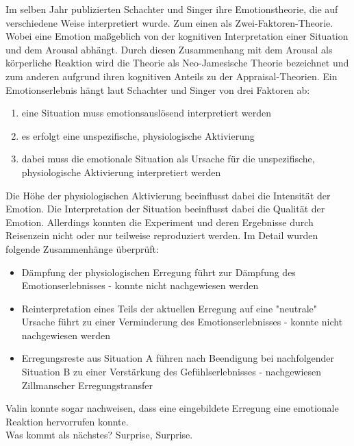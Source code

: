 Im selben Jahr publizierten Schachter und Singer ihre Emotionstheorie, die auf verschiedene Weise interpretiert wurde. Zum einen als Zwei-Faktoren-Theorie. Wobei eine Emotion maßgeblich von der kognitiven Interpretation einer Situation und dem Arousal abhängt. Durch diesen Zusammenhang mit dem Arousal als körperliche Reaktion wird die Theorie als Neo-Jamesische Theorie bezeichnet und zum anderen aufgrund ihren kognitiven Anteils zu der Appraisal-Theorien. Ein Emotionserlebnis hängt laut Schachter und Singer von drei Faktoren ab:

\begin{enumerate}
\item eine Situation muss emotionsauslösend interpretiert werden
\item es erfolgt eine unspezifische, physiologische Aktivierung
\item dabei muss die emotionale Situation als Ursache für die unspezifische, physiologische Aktivierung interpretiert werden
\end{enumerate}

Die Höhe der physiologischen Aktivierung beeinflusst dabei die Intensität der Emotion. Die Interpretation der Situation beeinflusst dabei die Qualität der Emotion. Allerdings konnten die Experiment und deren Ergebnisse durch Reisenzein nicht oder nur teilweise reproduziert werden. Im Detail wurden folgende Zusammenhänge überprüft:
\begin{itemize}
\item Dämpfung der physiologischen Erregung führt zur Dämpfung des Emotionserlebnisses - konnte nicht nachgewiesen werden

\item Reinterpretation eines Teils der aktuellen Erregung auf eine "neutrale" Ursache führt zu einer Verminderung des Emotionserlebnisses - konnte nicht nachgewiesen werden

\item Erregungsreste aus Situation A führen nach Beendigung bei nachfolgender Situation B zu einer Verstärkung des Gefühlserlebnisses - nachgewiesen Zillmanscher Erregungstransfer
\end{itemize}

Valin konnte sogar nachweisen, dass eine eingebildete Erregung eine emotionale Reaktion hervorrufen konnte. \\

Was kommt als nächstes? Surprise, Surprise.









